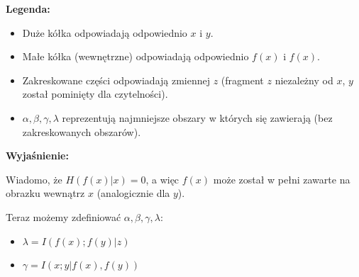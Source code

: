 \newpage
\textbf{Legenda:}

\begin{itemize}
	\item Duże kółka odpowiadają odpowiednio $x$ i $y$.
	\item Małe kółka (wewnętrzne) odpowiadają odpowiednio $f(x)$ i $f(x)$.
	\item Zakreskowane części odpowiadają zmiennej $z$ (fragment $z$ niezależny od $x$, $y$ został pominięty dla czytelności).
	\item $\alpha, \beta, \gamma, \lambda$ reprezentują najmniejsze obszary w których się zawierają (bez zakreskowanych obszarów).
\end{itemize}

\textbf{Wyjaśnienie:}

Wiadomo, że $H(f(x) | x) = 0$, a więc $f(x)$ może został w pełni zawarte na obrazku wewnątrz $x$ (analogicznie dla $y$).

Teraz możemy zdefiniować $\alpha, \beta, \gamma, \lambda$:
\begin{itemize}
	\item $\lambda = I(f(x) ; f(y) | z)$ 
	\item $\gamma = I(x ; y | f(x), f(y))$ 
\end{itemize}



